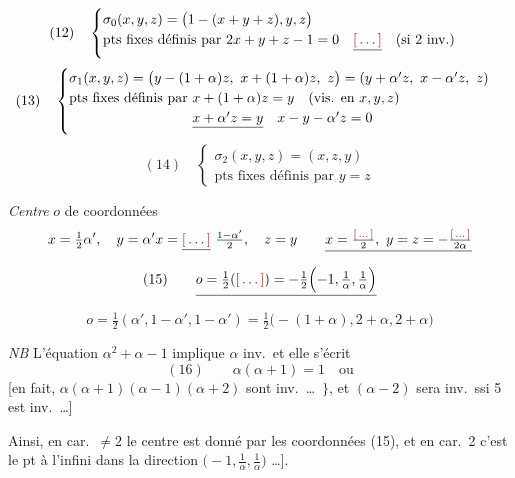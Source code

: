 \documentclass[11pt,a4paper]{article}
\begin{document}
\[ (12) \quad \begin{cases} \sigma_0(x, y, z) = \bigl(1 - (x + y + z), y, z\bigr) \\ \text{pts fixes définis par } 2x + y + z - 1 = 0 \quad \struck{\ill{}} \quad (\text{si } 2 \text{ inv.}) \end{cases} \]
\[ (13) \quad \begin{cases} \sigma_1(x, y, z) = \bigl(y - (1+\alpha)z,\ x + (1+\alpha)z,\ z\bigr) = (y + \alpha' z,\ x - \alpha' z,\ z) \\ \text{pts fixes définis par } x + (1+\alpha)z = y \quad (\text{vis. en } x, y, z) \\ \phantom{\text{pts fixes définis par }} \struck{x + \alpha' z = y} \quad x - y - \alpha' z = 0 \end{cases} \]
\[ (14) \quad \begin{cases} \sigma_2(x, y, z) = (x, z, y) \\ \text{pts fixes définis par } y = z \end{cases} \]

\emph{Centre} $o$ de coordonnées
\[ x = \tfrac{1}{2}\alpha', \quad y = \alpha' x = \struck{\ill{}}\ \tfrac{1 - \alpha'}{2}, \quad z = y \qquad \struck{x = \tfrac{\ill{}}{2},\ y = z = -\tfrac{\ill{}}{2\alpha}} \]
\[ (15) \qquad \struck{o = \tfrac{1}{2}(\ill{}) = -\tfrac{1}{2}\Bigl(-1, \tfrac{1}{\alpha}, \tfrac{1}{\alpha}\Bigr)} \]
\[ o = \tfrac{1}{2}(\alpha', 1 - \alpha', 1 - \alpha') = \tfrac{1}{2}\bigl(-(1+\alpha), 2 + \alpha, 2 + \alpha\bigr) \]

\emph{NB} L'équation $\alpha^2 + \alpha - 1$ implique $\alpha$ inv.\ et  elle s'écrit
\[ (16) \qquad \boxed{\alpha(\alpha + 1) = 1} \quad \text{ou} \]
 [en fait, $\alpha(\alpha+1)(\alpha-1)(\alpha+2)$  sont inv.\ \ldots\ $\}$, et $(\alpha - 2)$ sera inv.\ ssi 5 est inv.\ \ldots]

Ainsi, en car.\ $\neq 2$ le centre est donné par les coordonnées (15), et en car.\ 2  c'est le pt à l'infini dans la direction $\bigl(-1, \frac{1}{\alpha}, \frac{1}{\alpha}\bigr)$ \ldots].
\end{document}

